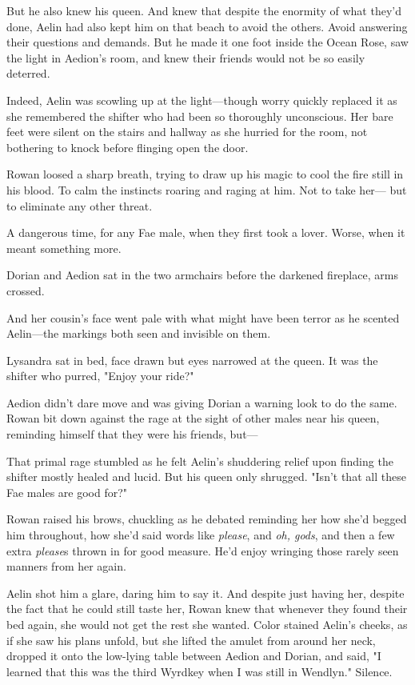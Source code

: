 But he also knew his queen.
And knew that despite the enormity of what they'd done, Aelin had also kept him on that beach to avoid the others.
Avoid answering their questions and demands.
But he made it one foot inside the Ocean Rose, saw the light in Aedion's room, and knew their friends would not be so easily deterred.

Indeed, Aelin was scowling up at the light---though worry quickly replaced it as she remembered the shifter who had been so thoroughly unconscious.
Her bare feet were silent on the stairs and hallway as she hurried for the room, not bothering to knock before flinging open the door.

Rowan loosed a sharp breath, trying to draw up his magic to cool the fire still in his blood.
To calm the instincts roaring and raging at him.
Not to take her--- but to eliminate any other threat.

A dangerous time, for any Fae male, when they first took a lover.
Worse, when it meant something more.

Dorian and Aedion sat in the two armchairs before the darkened fireplace, arms crossed.

And her cousin's face went pale with what might have been terror as he scented Aelin---the markings both seen and invisible on them.

Lysandra sat in bed, face drawn but eyes narrowed at the queen.
It was the shifter who purred, "Enjoy your ride?"

Aedion didn't dare move and was giving Dorian a warning look to do the same.
Rowan bit down against the rage at the sight of other males near his queen, reminding himself that they were his friends, but---

That primal rage stumbled as he felt Aelin's shuddering relief upon finding the shifter mostly healed and lucid.
But his queen only shrugged.
"Isn't that all these Fae males are good for?"

Rowan raised his brows, chuckling as he debated reminding her how she'd begged him throughout, how she'd said words like \emph{please}, and \emph{oh, gods}, and then a few extra \emph{please}s thrown in for good measure.
He'd enjoy wringing those rarely seen manners from her again.

Aelin shot him a glare, daring him to say it.
And despite just having her, despite the fact that he could still taste her, Rowan knew that whenever they found their bed again, she would not get the rest she wanted.
Color stained Aelin's cheeks, as if she saw his plans unfold, but she lifted the amulet from around her neck, dropped it onto the low-lying table between Aedion and Dorian, and said, "I learned that this was the third Wyrdkey when I was still in Wendlyn."
Silence.

